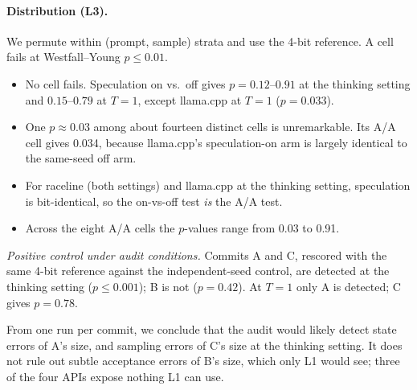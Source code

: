 \documentclass[10pt]{article}
\theoremstyle{remark}
\begin{document}
\paragraph{Distribution (L3).} We permute within (prompt, sample) strata and use the 4-bit reference. A cell fails at Westfall--Young $p\le0.01$.
\begin{itemize}
\item No cell fails. Speculation on vs.\ off gives $p=0.12$--$0.91$ at the thinking setting and $0.15$--$0.79$ at $T{=}1$, except llama.cpp at $T{=}1$ ($p=0.033$).
\item One $p\approx0.03$ among about fourteen distinct cells is unremarkable. Its A/A cell gives 0.034, because llama.cpp's speculation-on arm is largely identical to the same-seed off arm.
\item For raceline (both settings) and llama.cpp at the thinking setting, speculation is bit-identical, so the on-vs-off test \emph{is} the A/A test.
\item Across the eight A/A cells the $p$-values range from 0.03 to 0.91.
\end{itemize}
\emph{Positive control under audit conditions.} Commits A and C, rescored with the same 4-bit reference against the independent-seed control, are detected at the thinking setting ($p\le0.001$); B is not ($p=0.42$). At $T{=}1$ only A is detected; C gives $p=0.78$.

From one run per commit, we conclude that the audit would likely detect state errors of A's size, and sampling errors of C's size at the thinking setting. It does not rule out subtle acceptance errors of B's size, which only L1 would see; three of the four APIs expose nothing L1 can use.
\end{document}

